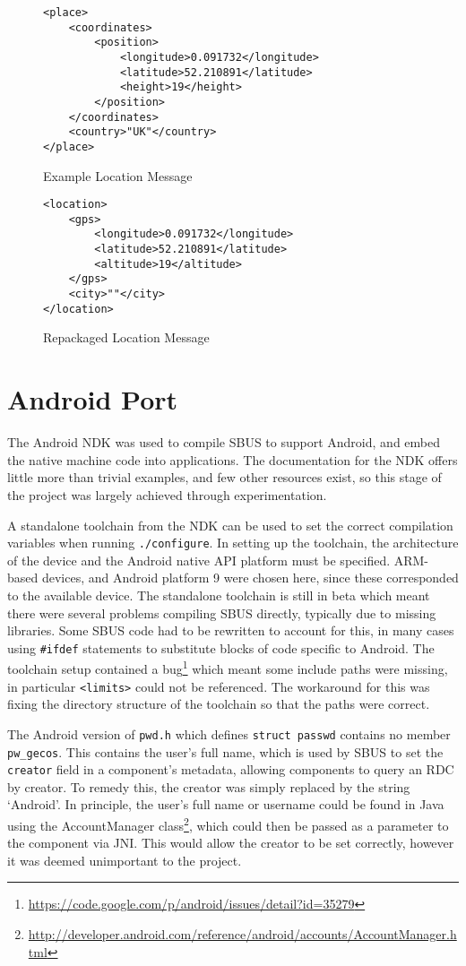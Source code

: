 \documentclass[12pt,twoside,notitlepage]{report}
\begin{document}
\begin{figure}
\begin{lstlisting}
<place>
	<coordinates>
		<position>
			<longitude>0.091732</longitude>
			<latitude>52.210891</latitude>
			<height>19</height>
		</position>
	</coordinates>
	<country>"UK"</country>
</place>
\end{lstlisting}
\caption{Example Location Message}
\label{fig:locationmessage}
\end{figure}

\begin{figure}
\begin{lstlisting}
<location>
	<gps>
		<longitude>0.091732</longitude>
		<latitude>52.210891</latitude>
		<altitude>19</altitude>
	</gps>
	<city>""</city>
</location>
\end{lstlisting}
\caption{Repackaged Location Message}
\label{fig:locationmessagerepack}
\end{figure}

\section{Android Port}

The Android NDK was used to compile SBUS to support Android, and embed the native machine code into applications. 
The documentation for the NDK offers little more than trivial examples, and few other resources exist, so this stage of the project was largely achieved through experimentation. 

A standalone toolchain from the NDK can be used to set the correct compilation variables when running {\tt ./configure}. 
In setting up the toolchain, the architecture of the device and the Android native API platform must be specified. 
ARM-based devices, and Android platform 9 were chosen here, since these corresponded to the available device. 
The standalone toolchain is still in beta which meant there were several problems compiling SBUS directly, typically due to missing libraries. 
Some SBUS code had to be rewritten to account for this, in many cases using {\tt \#ifdef} statements to substitute blocks of code specific to Android. 
The toolchain setup contained a bug\footnote{\url{https://code.google.com/p/android/issues/detail?id=35279}} which meant some include paths were missing, in particular {\tt <limits>} could not be referenced. 
The workaround for this was fixing the directory structure of the toolchain so that the paths were correct. 

The Android version of {\tt pwd.h} which defines {\tt struct passwd} contains no member {\tt pw\_gecos}. 
This contains the user's full name, which is used by SBUS to set the {\tt creator} field in a component's metadata, allowing components to query an RDC by creator. 
To remedy this, the creator was simply replaced by the string `Android'. 
In principle, the user's full name or username could be found in Java using the AccountManager class\footnote{\url{http://developer.android.com/reference/android/accounts/AccountManager.html}}, which could then be passed as a parameter to the component via JNI. 
This would allow the creator to be set correctly, however it was deemed unimportant to the project. 
\end{document}
